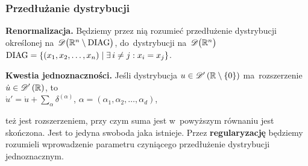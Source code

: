 \documentclass[10pt,t]{beamer}
\begin{document}
\begin{frame}
  \frametitle{Przedłużanie dystrybucji}


  \textbf{Renormalizacja.} Będziemy przez nią rozumieć przedłużenie
  dystrybucji określonej na~$\mathcal{D}\big( \mathbb{R}^{ n } \setminus \textrm{DIAG} \big)$,
  do~dystrybucji na~$\mathcal{D}\big( \mathbb{R}^{ n } \big)$ \\
  $\displaystyle
  \textrm{DIAG} =
  \left\{ ( x_{ 1 }, x_{ 2 }, \ldots, x_{ n } ) \; | \;
    \exists \, i \neq j : x_{ i } = x_{ j } \right\}$.

  \VerSpaceFour





  \textbf{Kwestia jednoznaczności.}
  Jeśli dystrybucja $u \in \mathcal{D}'\left( \mathbb{R} \setminus \{ 0 \} \right)$ ma~rozszerzenie
  $\displaystyle \dot{ u } \in \mathcal{D}'\left( \mathbb{R} \right)$, to \\
  $\displaystyle \dot{ u }' = \dot{ u } + \sum_{ \alpha } \delta^{ ( \alpha ) }$, \quad
  $\displaystyle \alpha = ( \alpha_{ 1 }, \alpha_{ 2 }, \ldots, \alpha_{ d } )$,

  też jest rozszerzeniem, przy czym suma jest w~powyższym równaniu
  jest skończona. Jest to jedyna swoboda jaka istnieje. Przez
  \textbf{regularyzację} będziemy rozumieli wprowadzenie parametru
  czyniącego przedłużenie dystrybucji jednoznacznym.

\end{frame}
\end{document}
